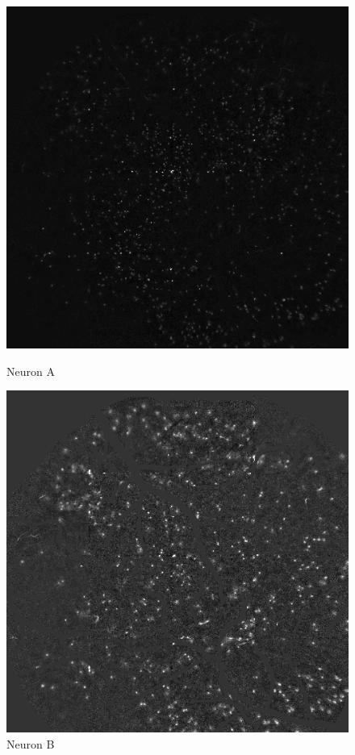 \documentclass[10pt]{article}
\begin{document}
\begin{figure}[h]
    \centering

    \begin{minipage}{0.49\textwidth}
      \centering
      \includegraphics[width=\textwidth]{figs/composite_A.png}
      \caption*{Neuron A}
    \end{minipage}
    \begin{minipage}{0.49\textwidth}
      \centering
      \includegraphics[width=\textwidth]{figs/composite_B.png}
      \caption*{Neuron B}
    \end{minipage}


\end{figure}
\end{document}
